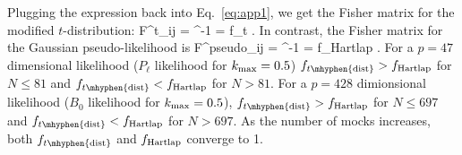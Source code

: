Plugging the expression back into Eq.~\ref{eq:app1}, we get the Fisher matrix for the modified $t$-distribution: 
\beq
F^{t}_{ij} = \estC^{-1} 
= f_{t} .
\eeq
In contrast, the Fisher matrix for the Gaussian pseudo-likelihood is 
\beq
F^{\rm pseudo}_{ij} = \estC^{-1}
= f_{\rm Hartlap} .
\eeq
For a $p{=}47$ dimensional likelihood ($P_\ell$ likelihood for 
$k_{\rm max} = 0.5$) $f_{t\mhyphen{\rm dist}} > f_{\rm Hartlap}$ for $N \le 81$ 
and $f_{t\mhyphen{\rm dist}} < f_{\rm Hartlap}$ for $N > 81$. For a $p{=}428$ 
dimionsional likelihood ($B_0$ likelihood for $k_{\rm max} = 0.5$), 
$f_{t\mhyphen{\rm dist}} > f_{\rm Hartlap}$ for $N \le 697$ and 
$f_{t\mhyphen{\rm dist}} < f_{\rm Hartlap}$ for $N > 697$. As the number of mocks 
increases, both $f_{t\mhyphen{\rm dist}}$ and $f_{\rm Hartlap}$ converge to 1. 




